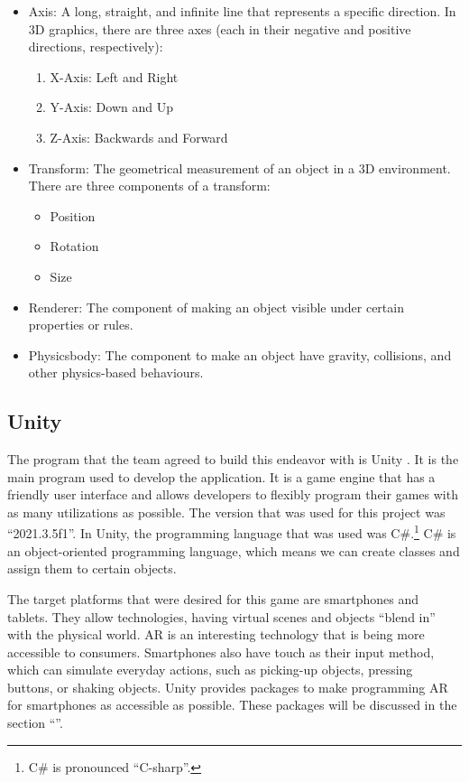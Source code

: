 \begin{itemize}
    \item{Axis: A long, straight, and infinite line that represents a specific direction. In 3D graphics, there are three axes (each in their negative and positive directions, respectively):
\begin{enumerate}
    \item{X-Axis: Left and Right}
    
    \item{Y-Axis: Down and Up}
    
    \item{Z-Axis: Backwards and Forward}

\end{enumerate}}

\item{Transform: The geometrical measurement of an object in a 3D environment. There are three components of a transform:

\begin{itemize}
    \item{Position}
    
    \item{Rotation}
    
    \item{Size}
\end{itemize}
}    

\item{Renderer: The component of making an object visible under certain properties or rules.}

\item{Physicsbody: The component to make an object have gravity, collisions, and other physics-based behaviours.}
\end{itemize}

\subsection{Unity}
The program that the team agreed to build this endeavor with is Unity \cite{Unity}. It is the main program used to develop the application. It is a game engine that has a friendly user interface and allows developers to flexibly program their games with as many utilizations as possible. The version that was used for this project was “2021.3.5f1”. In Unity, the programming language that was used was C\#.\footnote{C\# is pronounced “C-sharp”.} C\# is an object-oriented programming language, which means we can create classes and assign them to certain objects.

The target platforms that were desired for this game are smartphones and tablets. They allow  technologies, having virtual scenes and objects “blend in” with the physical world. \acrshort{AR} is an interesting technology that is being more accessible to consumers. Smartphones also have touch as their input method, which can simulate everyday actions, such as picking-up objects, pressing buttons, or shaking objects. Unity provides packages to make programming \acrshort{AR} for smartphones as accessible as possible. These packages will be discussed in the section “\textbf{}”.


